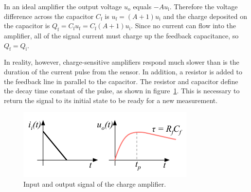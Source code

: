 In an ideal amplifier the output voltage $u_\mathrm{o}$ equals $-Au_\mathrm{i}$. Therefore the voltage difference across the capacitor $C_\mathrm{f}$ is $u_\mathrm{f}=(A+1)u_\mathrm{i}$ and the charge deposited on the capacitor is $Q_\mathrm{f}=C_\mathrm{f}u_\mathrm{f} = C_\mathrm{f}(A+1)u_\mathrm{i}$. Since no current can flow into the amplifier, all of the signal current must charge up the feedback capacitance, so $Q_\mathrm{f} = Q_\mathrm{i}$.

In reality, however, charge-sensitive amplifiers respond much slower than is the duration of the current pulse from the sensor. In addition, a resistor is added to the feedback line in parallel to the capacitor. The resistor and capacitor define the decay time constant of the pulse, as shown in figure~\ref{fig:chgrc}. This is necessary to return the signal to its initial state to be ready for a new measurement.
\begin{figure}[!t]
\begin{center}
\includegraphics[width=0.7\linewidth]{02_pulse_formation/pics/plots/chgrc}
\caption{Input and output signal of the charge amplifier.}
\label{fig:chgrc}
\end{center}
\end{figure}

